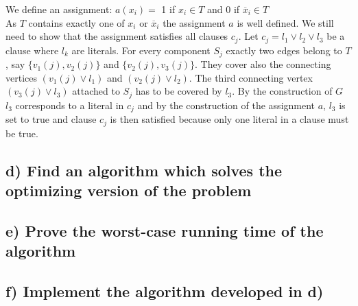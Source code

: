\documentclass[12pt]{article}
\begin{document}
We define an assignment: $a(x_i) =$ 1 if $x_i \in T$ and 0 if $\overline{x}_i \in T$\\
As $T$ contains exactly one of $x_i$ or $\overline{x}_i$ the assignment $a$ is well defined. We still need to show that the assignment satisfies all clauses $c_j$. Let $c_j = l_1 \vee l_2 \vee l_3$ be a clause where $l_k$ are literals. For every component $S_j$ exactly two edges belong to $T$, say $\{v_1(j),v_2(j)\}$ and $\{v_2(j),v_3(j)\}$. They cover also the connecting vertices $(v_1(j) \vee l_1)$ and $(v_2(j) \vee l_2)$. The third connecting vertex $(v_3(j) \vee l_3)$ attached to $S_j$ has to be covered by $l_3$. By the construction of $G$ $l_3$ corresponds to a literal in $c_j$ and by the construction of the assignment $a$, $l_3$ is set to true and clause $c_j$ is then satisfied because only one literal in a clause must be true.
\subsection*{d) Find an algorithm which solves the optimizing version of the problem}


\subsection*{e) Prove the worst-case running time of the algorithm}


\subsection*{f) Implement the algorithm developed in d)}
\end{document}
